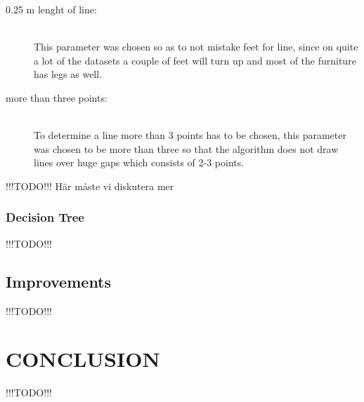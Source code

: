 \documentclass[a4paper, 10pt, conference]{ieeeconf}      %
\begin{document}
\begin{description}
\item[0.25 m lenght of line:] \hfill \\ This parameter was chosen so as to not mistake feet for line, since on quite a lot of the datasets a couple of feet will turn up and most of the furniture has legs as well.
\item[more than three points:] \hfill \\ To determine a line more than 3 points has to be chosen, this parameter was chosen to be more than three so that the algorithm does not draw lines over huge gaps which consists of 2-3 points.
\end{description}

!!!TODO!!! Här måste vi diskutera mer


\subsubsection{Decision Tree}
!!!TODO!!!

\subsection{Improvements}
!!!TODO!!!

\section{CONCLUSION}
!!!TODO!!!













\end{document}
